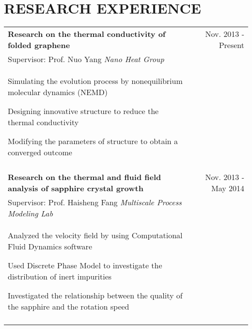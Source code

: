 \documentclass[a4paper,10pt]{article}
\begin{document}
\section{RESEARCH EXPERIENCE}
\begin{tabular}{p{14cm}r}
\large{\textbf{Research on the thermal conductivity of folded graphene}} & Nov. 2013 - Present \\
\hspace{1em} Supervisor: Prof. Nuo Yang \hspace{9em} \emph{Nano Heat Group} & \vspace{-0.5em}\\
\begin{compactitem}
       \item Simulating the evolution process by nonequilibrium molecular dynamics (NEMD)\vspace{0.2em}
       \item Designing innovative structure to reduce the thermal conductivity\vspace{0.2em}
       \item Modifying the parameters of structure to obtain a converged outcome
     \end{compactitem}&\vspace{-2.2em} \\
\multicolumn{2}{c}{} \\
\large{\textbf{Research on the thermal and fluid field analysis of sapphire crystal growth}}  &Nov. 2013 - May 2014 \\
\hspace{1em} Supervisor: Prof. Haisheng Fang \hspace{6em} \emph{Multiscale Process Modeling Lab}  & \vspace{-0.5em} \\
\begin{compactitem}
       \item Analyzed the velocity field by using Computational Fluid Dynamics software\vspace{0.2em}
       \item Used Discrete Phase Model to investigate the distribution of inert impurities\vspace{0.2em}
       \item Investigated the relationship between the quality of the sapphire and the rotation speed
     \end{compactitem}&\vspace{-2.2em} \\
\multicolumn{2}{c}{} \\

\end{tabular}
\end{document}
